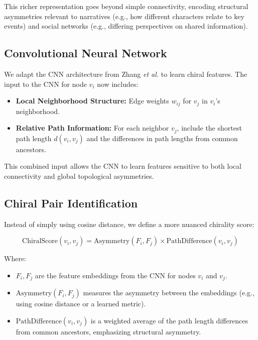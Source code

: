 \documentclass[12pt, a4paper]{article}
\begin{document}
This richer representation goes beyond simple connectivity, encoding structural asymmetries relevant to narratives (e.g., how different characters relate to key events) and social networks (e.g., differing perspectives on shared information).

\subsection{Convolutional Neural Network}

We adapt the CNN architecture from Zhang \textit{et al.} \cite{zhang2018machine} to learn chiral features. The input to the CNN for node $v_i$ now includes:

\begin{itemize}
    \item \textbf{Local Neighborhood Structure:} Edge weights $w_{ij}$ for $v_j$ in $v_i$'s neighborhood.
    \item \textbf{Relative Path Information:} For each neighbor $v_j$, include the shortest path length $d(v_i, v_j)$ and the differences in path lengths from common ancestors.
\end{itemize}

This combined input allows the CNN to learn features sensitive to both local connectivity and global topological asymmetries.

\subsection{Chiral Pair Identification}

Instead of simply using cosine distance, we define a more nuanced chirality score:

\begin{equation}
\text{ChiralScore}(v_i, v_j) = \text{Asymmetry}(F_i, F_j) \times \text{PathDifference}(v_i, v_j)
\end{equation}

Where:

\begin{itemize}
    \item $F_i, F_j$ are the feature embeddings from the CNN for nodes $v_i$ and $v_j$.
    \item $\text{Asymmetry}(F_i, F_j)$ measures the asymmetry between the embeddings (e.g., using cosine distance or a learned metric).
    \item $\text{PathDifference}(v_i, v_j)$ is a weighted average of the path length differences from common ancestors, emphasizing structural asymmetry.
\end{itemize}
\end{document}
